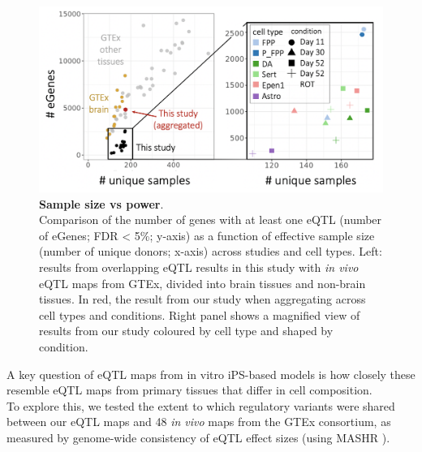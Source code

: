 
\begin{figure}[h]
\centering
\includegraphics[width=16cm]{Chapter5/Fig/neuroseq_eqtl_gtex_scatterplot.png}
\caption[Sample size vs power]{\textbf{Sample size vs power}.\\
Comparison of the number of genes with at least one eQTL (number of eGenes; FDR < 5\%; y-axis) as a function of effective sample size (number of unique donors; x-axis) across studies and cell types. 
Left: results from overlapping eQTL results in this study with \textit{in vivo} eQTL maps from GTEx, divided into brain tissues and non-brain tissues. 
In red, the result from our study when aggregating across cell types and conditions. 
Right panel shows a magnified view of results from our study coloured by cell type and shaped by condition.}
\label{fig:neuroseq_and_gtex_power}
\end{figure}

\newpage


A key question of eQTL maps from in vitro iPS-based models is how closely these resemble eQTL maps from primary tissues that differ in cell composition. \\ 

To explore this, we tested the extent to which regulatory variants were shared between our eQTL maps and 48 
\textit{in vivo} maps from the GTEx consortium, 
as measured by genome-wide consistency of eQTL effect sizes (using MASHR \cite{urbut2019flexible}).

